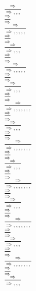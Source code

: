 \documentclass[11pt]{article}
\begin{document}
\begin{center}
\bigskip
\\$\frac{\Rightarrow }{\Rightarrow , , , }$
\bigskip
\\$\frac{\Rightarrow }{\Rightarrow }$
\bigskip
\\$\frac{\Rightarrow }{\Rightarrow , , , , , }$
\bigskip
\\$\frac{\Rightarrow }{\Rightarrow }$
\bigskip
\\$\frac{\Rightarrow }{\Rightarrow , , , }$
\bigskip
\\$\frac{\Rightarrow }{\Rightarrow }$
\bigskip
\\$\frac{\Rightarrow }{\Rightarrow , , , , , }$
\bigskip
\\$\frac{\Rightarrow }{\Rightarrow }$
\bigskip
\\$\frac{\Rightarrow }{\Rightarrow , , , }$
\bigskip
\\$\frac{\Rightarrow }{\Rightarrow }$
\bigskip
\\$\frac{\Rightarrow }{\Rightarrow , , , , , , , }$
\bigskip
\\$\frac{\Rightarrow }{\Rightarrow }$
\bigskip
\\$\frac{\Rightarrow }{\Rightarrow , , , }$
\bigskip
\\$\frac{\Rightarrow }{\Rightarrow }$
\bigskip
\\$\frac{\Rightarrow }{\Rightarrow , , , , , , , }$
\bigskip
\\$\frac{\Rightarrow }{\Rightarrow }$
\bigskip
\\$\frac{\Rightarrow }{\Rightarrow , , , }$
\bigskip
\\$\frac{\Rightarrow }{\Rightarrow }$
\bigskip
\\$\frac{\Rightarrow }{\Rightarrow , , , , , , , }$
\bigskip
\\$\frac{\Rightarrow }{\Rightarrow }$
\bigskip
\\$\frac{\Rightarrow }{\Rightarrow , , , }$
\bigskip
\\$\frac{\Rightarrow }{\Rightarrow }$
\bigskip
\\$\frac{\Rightarrow }{\Rightarrow , , , , , , , }$
\bigskip
\\$\frac{\Rightarrow }{\Rightarrow }$
\bigskip
\\$\frac{\Rightarrow }{\Rightarrow , , , }$
\bigskip
\\$\frac{\Rightarrow }{\Rightarrow }$
\bigskip
\\$\frac{\Rightarrow }{\Rightarrow , , , , , , , }$
\bigskip
\\$\frac{\Rightarrow }{\Rightarrow }$
\bigskip
\\$\frac{\Rightarrow }{\Rightarrow , , , }$

\end{center}
\end{document}
